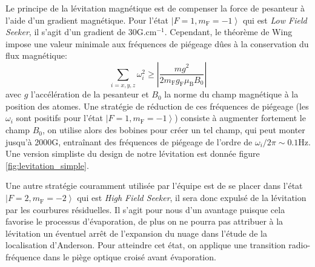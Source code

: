 Le principe de la lévitation magnétique est de compenser la force de pesanteur à l'aide d'un gradient magnétique. Pour l'état $\left| F=1, m_{\mathrm{F}}=-1 \right\rangle$ qui est \emph{Low Field Seeker}, il s'agit d'un gradient de 30G.cm${}^{-1}$. Cependant, le théorème de Wing impose une valeur minimale aux fréquences de piégeage dûes à la conservation du flux magnétique:
\begin{equation}
\sum_{i=x,y,z} \omega_i^2 \geq \left| \frac{mg^2}{2m_{\mathrm{F}} g_{\mathrm{F}} \mu_{\mathrm{B}} B_0}\right|
\end{equation} 
avec $g$ l'accélération de la pesanteur et $B_0$ la norme du champ magnétique à la position des atomes. Une stratégie de réduction de ces fréquences de piégeage (les $\omega_i$ sont positifs pour l'état $\left|F=1, m_{\mathrm{F}}=-1 \right\rangle$) consiste à augmenter fortement le champ $B_0$, on utilise alors des bobines pour créer un tel champ, qui peut monter jusqu'à 2000G, entraînant des fréquences de piégeage de l'ordre de $\omega_i /2 \pi \sim 0.1$Hz. Une version simpliste du design de notre lévitation est donnée figure \ref{fig:levitation_simple}.

Une autre stratégie couramment utilisée par l'équipe est de se placer dans l'état $\left|F=2,m_{\mathrm{F}}=-2 \right\rangle$ qui est \textit{High Field Seeker}, il sera donc expulsé de la lévitation par les courbures résiduelles. Il s'agit pour nous d'un avantage puisque cela favorise le processus d'évaporation, de plus on ne pourra pas attribuer à la lévitation un éventuel arrêt de l'expansion du nuage dans l'étude de la localisation d'Anderson. Pour atteindre cet état, on applique une transition radio-fréquence dans le piège optique croisé avant évaporation.

